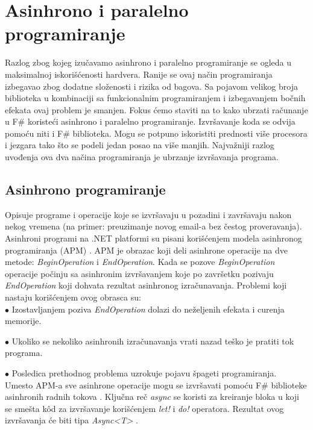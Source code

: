 \documentclass[a4paper]{article}
\begin{document}
\section{Asinhrono i paralelno programiranje}

Razlog zbog kojeg izučavamo asinhrono i paralelno programiranje se ogleda u maksimalnoj iskorišćenosti hardvera. Ranije se ovaj način programiranja izbegavao zbog dodatne složenosti i rizika od bagova. Sa pojavom velikog broja biblioteka u kombinaciji sa funkcionalnim programiranjem i izbegavanjem bočnih efekata ovaj problem je smanjen. Fokus ćemo staviti na to kako ubrzati računanje u F\# koristeći asinhrono i paralelno programiranje. Izvršavanje koda se odvija pomoću niti i F\# biblioteka. Mogu se potpuno iskoristiti prednosti više procesora i jezgara tako što se podeli jedan posao na više manjih. Najvažniji razlog uvođenja ova dva načina programiranja je ubrzanje izvršavanja programa.


\subsection{Asinhrono programiranje} 

Opisuje programe i operacije koje se izvršavaju u pozadini i završavaju nakon nekog vremena (na primer: preuzimanje novog email-a bez čestog proveravanja). Asinhroni programi na .NET platformi su pisani korišćenjem modela asinhronog programiranja (APM) \cite{apm}. APM je obrazac koji deli asinhrone operacije na dve metode: {\em BeginOperation} i {\em EndOperation}. Kada se pozove {\em BeginOperation} operacije počinju sa asinhronim izvršavanjem koje po završetku pozivaju {\em EndOperation} koji dohvata rezultat asinhronog izračunavanja. Problemi koji nastaju korišćenjem ovog obrasca su: \\

$\bullet$ Izostavljanjem poziva {\em EndOperation} dolazi do neželjenih efekata i curenja memorije. 
 
$\bullet$ Ukoliko se nekoliko asinhronih izračunavanja vrati nazad teško je pratiti tok programa.
	
$\bullet$ Posledica prethodnog problema uzrokuje pojavu špageti programiranja. \\

Umesto APM-a sve asinhrone operacije mogu se izvršavati pomoću F\# biblioteke asinhronih radnih tokova \cite{progFs}. Ključna reč {\em async} se koristi za kreiranje bloka u koji se smešta kôd za izvršavanje korišćenjem {\em let!} i {\em do!} operatora. Rezultat ovog izvršavanja će biti tipa {\em Async<T>} \cite{progFs}.
\end{document}

